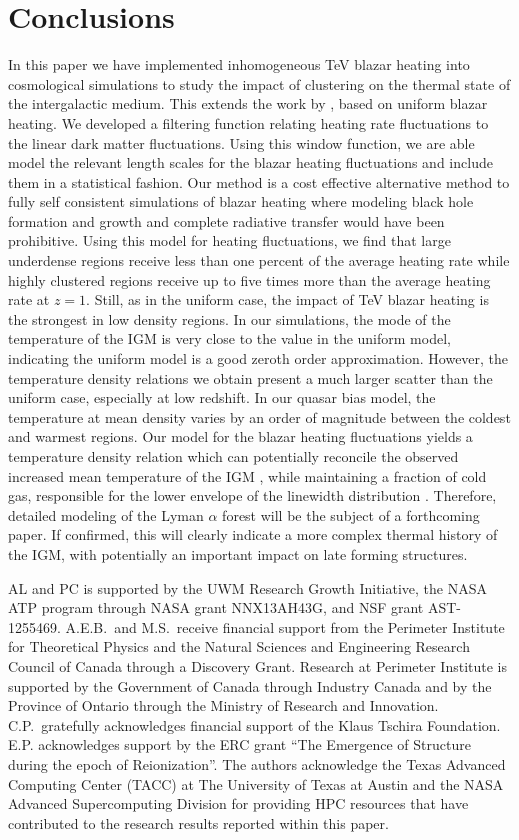 \documentclass[twocolumns]{emulateapj}
\begin{document}
\section{Conclusions}
In this paper we have implemented inhomogeneous TeV blazar heating into cosmological simulations to study the impact of clustering on the thermal state of the intergalactic medium. This extends the work by \citet{2012ApJ...752...23C,2012MNRAS.423..149P}, based on uniform blazar heating.
We developed a filtering function relating heating rate fluctuations to the linear dark matter fluctuations. Using this window function, we are able model the relevant length scales for the blazar heating fluctuations and include them in a statistical fashion. Our method is a cost effective alternative method to fully self consistent simulations of blazar heating where modeling black hole formation and growth and complete radiative transfer would have been prohibitive.
Using this model for heating fluctuations, we find that large underdense regions receive less than one percent of the average heating rate while highly clustered regions receive up to five times more than the average heating rate at $z=1$. Still, as in the uniform case, the impact of TeV blazar heating is the strongest in low density regions. In our simulations, the mode of the temperature of the IGM is very close to the value in the uniform model, indicating the uniform model is a good zeroth order approximation. However, the temperature density relations we obtain present a much larger scatter than the uniform case, especially at low redshift. In our quasar bias model, the temperature at mean density varies by an order of magnitude between the coldest and warmest regions.
Our model for the blazar heating fluctuations yields a temperature density relation which can potentially reconcile the observed increased mean temperature of the IGM \citep{2014MNRAS.441.1916B}, while maintaining a fraction of cold gas, responsible for the lower envelope of the linewidth distribution \citep{2012ApJ...757L..30R}. Therefore, detailed modeling of the Lyman $\alpha$ forest will be the subject of a forthcoming paper. If confirmed, this will clearly indicate a more complex thermal history of the IGM, with potentially an important impact on late forming structures.
\begin{acknowledgements}
AL and PC is supported by the UWM Research Growth Initiative, the NASA ATP
program through NASA grant NNX13AH43G, and NSF grant AST-1255469.
A.E.B.~and M.S.~receive financial support from the Perimeter
Institute for Theoretical Physics and the Natural Sciences and
Engineering Research Council of Canada through a Discovery Grant.
Research at Perimeter Institute is supported by the Government of
Canada through Industry Canada and by the Province of Ontario through
the Ministry of Research and Innovation.
C.P.~gratefully acknowledges
financial support of the Klaus Tschira Foundation. E.P. acknowledges support by the ERC grant ``The Emergence of Structure during the epoch of Reionization''.
The authors acknowledge the Texas Advanced Computing Center (TACC) at The University of Texas at Austin and the NASA Advanced Supercomputing Division for providing HPC resources that have contributed to the research results reported within this paper.
\end{acknowledgements}
\end{document}
